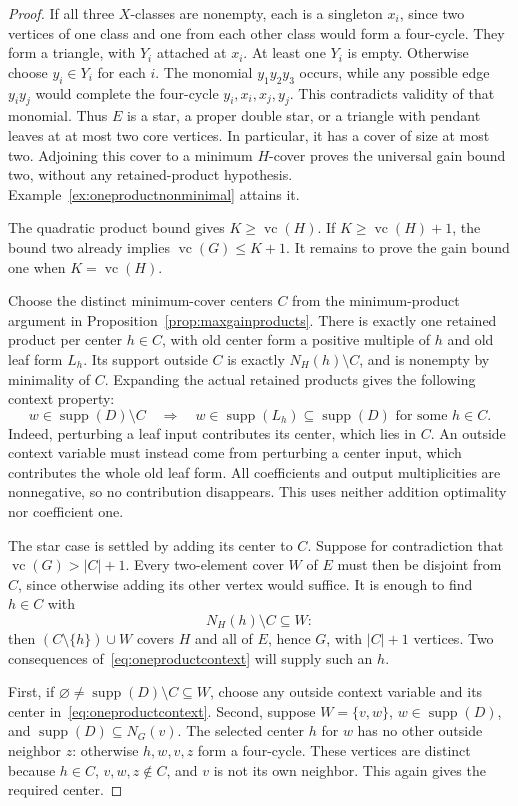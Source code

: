 \documentclass[11pt]{article}
\newcommand{\supp}{\operatorname{supp}}
\newcommand{\vc}{\operatorname{vc}}
\theoremstyle{definition}
\theoremstyle{remark}
\begin{document}
\begin{proof}
If all three $X$-classes are nonempty, each is a singleton $x_i$, since two vertices of one class and one from each other class would form a four-cycle. They form a triangle, with $Y_i$ attached at $x_i$. At least one $Y_i$ is empty. Otherwise choose $y_i\in Y_i$ for each $i$. The monomial $y_1y_2y_3$ occurs, while any possible edge $y_iy_j$ would complete the four-cycle $y_i,x_i,x_j,y_j$. This contradicts validity of that monomial. Thus $E$ is a star, a proper double star, or a triangle with pendant leaves at at most two core vertices. In particular, it has a cover of size at most two. Adjoining this cover to a minimum $H$-cover proves the universal gain bound two, without any retained-product hypothesis. Example~\ref{ex:oneproductnonminimal} attains it.

The quadratic product bound gives $K\ge\vc(H)$. If $K\ge\vc(H)+1$, the bound two already implies $\vc(G)\le K+1$. It remains to prove the gain bound one when $K=\vc(H)$.

Choose the distinct minimum-cover centers $C$ from the minimum-product argument in Proposition~\ref{prop:maxgainproducts}. There is exactly one retained product per center $h\in C$, with old center form a positive multiple of $h$ and old leaf form $L_h$. Its support outside $C$ is exactly $N_H(h)\setminus C$, and is nonempty by minimality of $C$. Expanding the actual retained products gives the following context property:
\begin{equation}\label{eq:oneproductcontext}
 w\in\supp(D)\setminus C\quad\Longrightarrow\quad
 w\in\supp(L_h)\subseteq\supp(D)\text{ for some }h\in C.
\end{equation}
Indeed, perturbing a leaf input contributes its center, which lies in $C$. An outside context variable must instead come from perturbing a center input, which contributes the whole old leaf form. All coefficients and output multiplicities are nonnegative, so no contribution disappears. This uses neither addition optimality nor coefficient one.

The star case is settled by adding its center to $C$. Suppose for contradiction that $\vc(G)>|C|+1$. Every two-element cover $W$ of $E$ must then be disjoint from $C$, since otherwise adding its other vertex would suffice. It is enough to find $h\in C$ with
\[
 N_H(h)\setminus C\subseteq W:
\]
then $(C\setminus\{h\})\cup W$ covers $H$ and all of $E$, hence $G$, with $|C|+1$ vertices. Two consequences of~\eqref{eq:oneproductcontext} will supply such an $h$.

First, if $\varnothing\ne\supp(D)\setminus C\subseteq W$, choose any outside context variable and its center in~\eqref{eq:oneproductcontext}. Second, suppose $W=\{v,w\}$, $w\in\supp(D)$, and $\supp(D)\subseteq N_G(v)$. The selected center $h$ for $w$ has no other outside neighbor $z$: otherwise $h,w,v,z$ form a four-cycle. These vertices are distinct because $h\in C$, $v,w,z\notin C$, and $v$ is not its own neighbor. This again gives the required center.


\end{proof}
\end{document}
